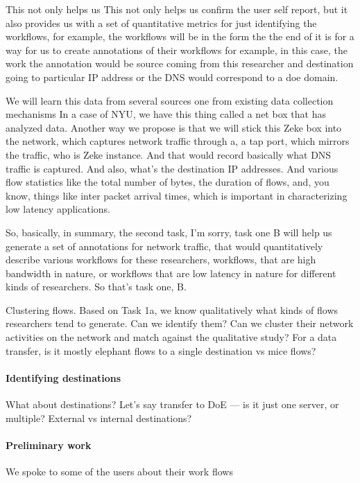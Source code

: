 This not only helps us This not only helps us confirm the user self report, but it also provides us with a set of quantitative metrics for just identifying the workflows, for example, the workflows will be in the form the the end of it is for a way for us to create annotations of their workflows for example, in this case, the work the annotation would be source coming from this researcher and destination going to particular IP address or the DNS would correspond to a doe domain.

We will learn this data from several sources one from existing data collection mechanisms In a case of NYU, we have this thing called a net box that has analyzed data. Another way we propose is that we will stick this Zeke box into the network, which captures network traffic through a, a tap port, which mirrors the traffic, who is Zeke instance. And that would record basically what DNS traffic is captured. And also, what's the destination IP addresses. And various flow statistics like the total number of bytes, the duration of flows, and, you know, things like inter packet arrival times, which is important in characterizing low latency applications.

So, basically, in summary, the second task, I'm sorry, task one B will help us generate a set of annotations for network traffic, that would quantitatively describe various workflows for these researchers, workflows, that are high bandwidth in nature, or workflows that are low latency in nature for different kinds of researchers. So that's task one, B.





Clustering flows. Based on Task 1a, we know qualitatively what kinds of flows researchers tend to generate. Can we identify them? Can we cluster their network activities on the network and match against the qualitative study? For a data transfer, is it mostly elephant flows to a single destination vs mice flows?


\paragraph{Identifying destinations}
What about destinations? Let's say transfer to DoE — is it just one server, or multiple? External vs internal destinations?

\paragraph{Preliminary work} We spoke to some of the users about their work flows

